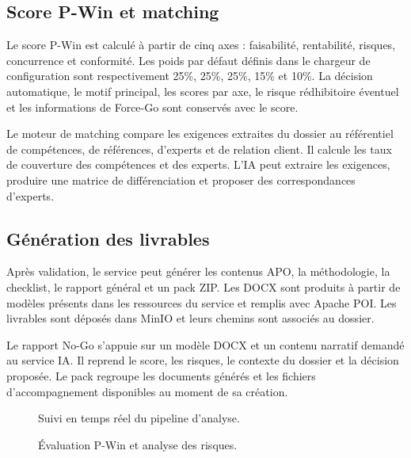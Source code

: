 \subsection{Score P-Win et matching}

Le score P-Win est calculé à partir de cinq axes : faisabilité, rentabilité, risques, concurrence et conformité. Les poids par défaut définis dans le chargeur de configuration sont respectivement 25\%, 25\%, 25\%, 15\% et 10\%. La décision automatique, le motif principal, les scores par axe, le risque rédhibitoire éventuel et les informations de Force-Go sont conservés avec le score.

Le moteur de matching compare les exigences extraites du dossier au référentiel de compétences, de références, d’experts et de relation client. Il calcule les taux de couverture des compétences et des experts. L’IA peut extraire les exigences, produire une matrice de différenciation et proposer des correspondances d’experts.

\subsection{Génération des livrables}

Après validation, le service peut générer les contenus APO, la méthodologie, la checklist, le rapport général et un pack ZIP. Les DOCX sont produits à partir de modèles présents dans les ressources du service et remplis avec Apache POI. Les livrables sont déposés dans MinIO et leurs chemins sont associés au dossier.

Le rapport No-Go s’appuie sur un modèle DOCX et un contenu narratif demandé au service IA. Il reprend le score, les risques, le contexte du dossier et la décision proposée. Le pack regroupe les documents générés et les fichiers d’accompagnement disponibles au moment de sa création.

\begin{figure}[H]
\centering
\caption{Suivi en temps réel du pipeline d’analyse.}
\label{fig:pipeline-sse}
\end{figure}

\begin{figure}[H]
\centering
\caption{Évaluation P-Win et analyse des risques.}
\label{fig:pwin}
\end{figure}

